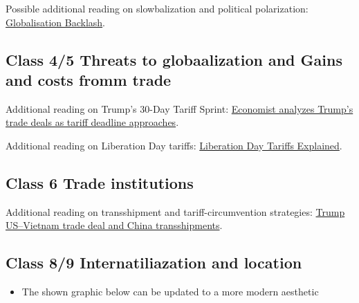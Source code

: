 \documentclass[
  11pt,
]{article}
\providecommand{\tightlist}{%
  \setlength{\itemsep}{0pt}\setlength{\parskip}{0pt}}
\begin{document}
Possible additional reading on slowbalization and political
polarization:
\href{https://cepr.org/voxeu/columns/globalisation-backlash}{Globalisation
Backlash}.

\subsection{Class 4/5 Threats to globaalization and Gains and costs
fromm
trade}\label{class-45-threats-to-globaalization-and-gains-and-costs-fromm-trade}

Additional reading on Trump's 30-Day Tariff Sprint:
\href{https://www.pbs.org/newshour/show/economist-analyzes-trumps-trade-deals-as-tariff-deadline-approaches}{Economist
analyzes Trump's trade deals as tariff deadline approaches}.

Additional reading on Liberation Day tariffs:
\href{https://www.csis.org/analysis/liberation-day-tariffs-explained\#:~:text=In\%20a\%20Rose\%20Garden\%20event,place\%20a\%20universal\%2010\%20percent}{Liberation
Day Tariffs Explained}.

\subsection{Class 6 Trade
institutions}\label{class-6-trade-institutions}

Additional reading on transshipment and tariff-circumvention strategies:
\href{https://time.com/7300087/trump-us-vietnam-trade-deal-china-transshipments/}{Trump
US--Vietnam trade deal and China transshipments}.

\subsection{Class 8/9 Internatiliazation and
location}\label{class-89-internatiliazation-and-location}

\begin{itemize}
\tightlist
\item
  The shown graphic below can be updated to a more modern aesthetic
\end{itemize}
\end{document}
